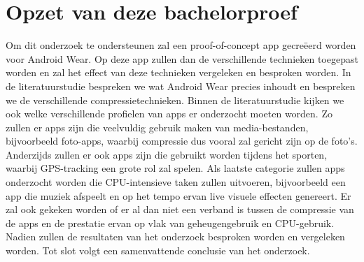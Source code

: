 \section{Opzet van deze bachelorproef}
\label{sec:opzet-bachelorproef}





Om dit onderzoek te ondersteunen zal een proof-of-concept app gecreëerd worden voor Android Wear. Op deze app zullen dan de verschillende technieken toegepast worden en zal het effect van deze technieken vergeleken en besproken worden. In de literatuurstudie bespreken we wat Android Wear precies inhoudt en bespreken we de verschillende compressietechnieken. Binnen de literatuurstudie kijken we ook welke verschillende profielen van apps er onderzocht moeten worden. Zo zullen er apps zijn die veelvuldig gebruik maken van media-bestanden, bijvoorbeeld foto-apps, waarbij compressie dus vooral zal gericht zijn op de foto's. Anderzijds zullen er ook apps zijn die gebruikt worden tijdens het sporten, waarbij GPS-tracking een grote rol zal spelen. Als laatste categorie zullen apps onderzocht worden die CPU-intensieve taken zullen uitvoeren, bijvoorbeeld een app die muziek afspeelt en op het tempo ervan live visuele effecten genereert. Er zal ook gekeken worden of er al dan niet een verband is tussen de compressie van de apps en de prestatie ervan op vlak van geheugengebruik en CPU-gebruik. Nadien zullen de resultaten van het onderzoek besproken worden en vergeleken worden. Tot slot volgt een samenvattende conclusie van het onderzoek. 



